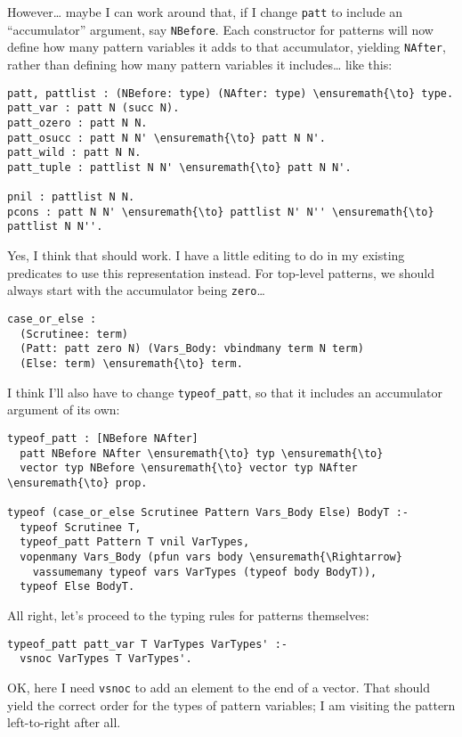 However\ldots{} maybe I can work around that, if I change \texttt{patt}
to include an ``accumulator'' argument, say \texttt{NBefore}. Each
constructor for patterns will now define how many pattern variables it
adds to that accumulator, yielding \texttt{NAfter}, rather than defining
how many pattern variables it includes\ldots{} like this:

\begin{verbatim}
patt, pattlist : (NBefore: type) (NAfter: type) \ensuremath{\to} type.
patt_var : patt N (succ N).
patt_ozero : patt N N.
patt_osucc : patt N N' \ensuremath{\to} patt N N'.
patt_wild : patt N N.
patt_tuple : pattlist N N' \ensuremath{\to} patt N N'.

pnil : pattlist N N.
pcons : patt N N' \ensuremath{\to} pattlist N' N'' \ensuremath{\to} pattlist N N''.
\end{verbatim}

Yes, I think that should work. I have a little editing to do in my
existing predicates to use this representation instead. For top-level
patterns, we should always start with the accumulator being
\texttt{zero}\ldots{}

\begin{verbatim}
case_or_else :
  (Scrutinee: term)
  (Patt: patt zero N) (Vars_Body: vbindmany term N term)
  (Else: term) \ensuremath{\to} term.
\end{verbatim}

I think I'll also have to change \texttt{typeof\_patt}, so that it
includes an accumulator argument of its own:

\begin{verbatim}
typeof_patt : [NBefore NAfter]
  patt NBefore NAfter \ensuremath{\to} typ \ensuremath{\to}
  vector typ NBefore \ensuremath{\to} vector typ NAfter \ensuremath{\to} prop.

typeof (case_or_else Scrutinee Pattern Vars_Body Else) BodyT :-
  typeof Scrutinee T,
  typeof_patt Pattern T vnil VarTypes,
  vopenmany Vars_Body (pfun vars body \ensuremath{\Rightarrow}
    vassumemany typeof vars VarTypes (typeof body BodyT)),
  typeof Else BodyT.
\end{verbatim}

All right, let's proceed to the typing rules for patterns themselves:

\begin{verbatim}
typeof_patt patt_var T VarTypes VarTypes' :-
  vsnoc VarTypes T VarTypes'.
\end{verbatim}

OK, here I need \texttt{vsnoc} to add an element to the end of a vector.
That should yield the correct order for the types of pattern variables;
I am visiting the pattern left-to-right after all.

